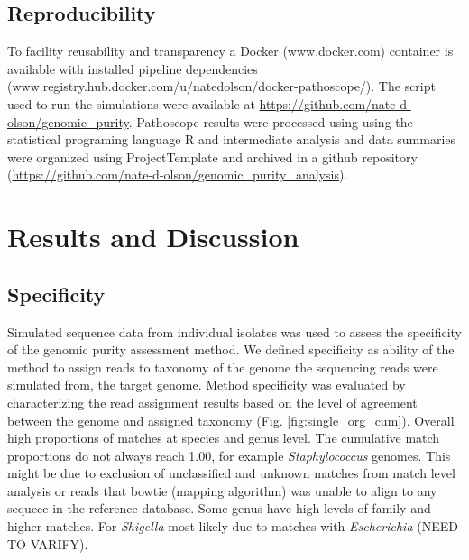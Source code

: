 \documentclass[fleqn,10pt,lineno]{wlpeerj}\usepackage[]{graphicx}\usepackage[]{color}
\begin{document}
\subsection*{Reproducibility}
To facility reusability and transparency a Docker (www.docker.com) container is available with installed pipeline dependencies (www.registry.hub.docker.com/u/natedolson/docker-pathoscope/). 
The script used to run the simulations were available at \url{https://github.com/nate-d-olson/genomic_purity}. 
Pathoscope results were processed using using the statistical programing language R \citep{R} and intermediate analysis and data summaries were organized using ProjectTemplate \citep{ProjectTemplate} and archived in a github repository (\url{https://github.com/nate-d-olson/genomic_purity_analysis}).

\section*{Results and Discussion}

\subsection*{Specificity}

Simulated sequence data from individual isolates was used to assess the specificity of the genomic purity assessment method.  
We defined specificity as ability of the method to assign reads to taxonomy of the genome the sequencing reads were simulated from, the target genome. 
Method specificity was evaluated by characterizing the read assignment results based on the level of agreement between the genome and assigned taxonomy (Fig. \ref{fig:single_org_cum}). 
Overall high proportions of matches at species and genus level. 
The cumulative match proportions do not always reach 1.00, for example \textit{Staphylococcus} genomes. 
This might be due to exclusion of unclassified and unknown matches from match level analysis or reads that bowtie (mapping algorithm) was unable to align to any sequece in the reference database. 
Some genus have high levels of family and higher matches. 
For \textit{Shigella} most likely due to matches with \textit{Escherichia} (NEED TO VARIFY). 
\end{document}
